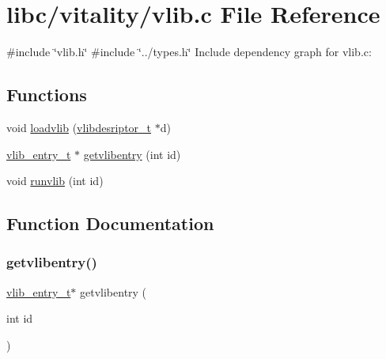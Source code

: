 \hypertarget{a00155}{}\section{libc/vitality/vlib.c File Reference}
\label{a00155}
{\ttfamily \#include \char`\"{}vlib.\+h\char`\"{}}\newline
{\ttfamily \#include \char`\"{}../types.\+h\char`\"{}}\newline
Include dependency graph for vlib.\+c\+:
\subsection*{Functions}
\begin{DoxyCompactItemize}
\item 
void \hyperlink{a00155_aee69008de31826f28854c29a54cb315e_aee69008de31826f28854c29a54cb315e}{loadvlib} (\hyperlink{a00158_a2d9000b4fbb25c5ed2950a2d8f4921d5_a2d9000b4fbb25c5ed2950a2d8f4921d5}{vlibdesriptor\+\_\+t} $\ast$d)
\item 
\hyperlink{a00158_a97c1a7136f2ab06368e93c2d7533d619_a97c1a7136f2ab06368e93c2d7533d619}{vlib\+\_\+entry\+\_\+t} $\ast$ \hyperlink{a00155_aeeb1b55b301de7b4c7aa360c387c3ef9_aeeb1b55b301de7b4c7aa360c387c3ef9}{getvlibentry} (int id)
\item 
void \hyperlink{a00155_a6889af26c1cca94090023d5975955cbf_a6889af26c1cca94090023d5975955cbf}{runvlib} (int id)
\end{DoxyCompactItemize}


\subsection{Function Documentation}
\mbox{\label{a00155_aeeb1b55b301de7b4c7aa360c387c3ef9_aeeb1b55b301de7b4c7aa360c387c3ef9}} 
\subsubsection{\texorpdfstring{getvlibentry()}{getvlibentry()}}
{\footnotesize\ttfamily \hyperlink{a00158_a97c1a7136f2ab06368e93c2d7533d619_a97c1a7136f2ab06368e93c2d7533d619}{vlib\+\_\+entry\+\_\+t}$\ast$ getvlibentry (\begin{DoxyParamCaption}\item[{int}]{id }\end{DoxyParamCaption})}



